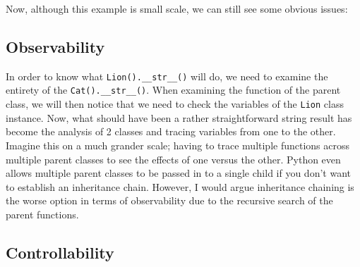 \documentclass{article}
\begin{document}
%

Now, although this example is small scale, we can still see some
obvious issues:

\subsection{Observability}

In order to know what \texttt{Lion().\_\_str\_\_()} will do, we need
to examine the entirety of the \texttt{Cat().\_\_str\_\_()}. When
examining the function of the parent class, we will then notice that
we need to check the variables of the \texttt{Lion} class instance.
Now, what should have been a rather straightforward string result has
become the analysis of 2 classes and tracing variables from one to the
other. Imagine this on a much grander scale; having to trace multiple
functions across multiple parent classes to see the effects of one
versus the other. Python even allows multiple parent classes to be
passed in to a single child if you don't want to establish an
inheritance chain. However, I would argue inheritance chaining is the
worse option in terms of observability due to the recursive search of
the parent functions.

\subsection{Controllability}
\end{document}
